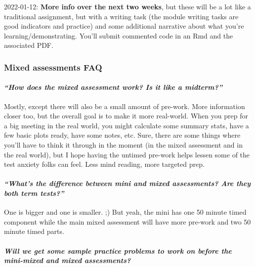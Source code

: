 \documentclass[
  openany]{book}
\begin{document}
2022-01-12: \textbf{More info over the next two weeks}, but these will be a lot like a traditional assignment, but with a writing task (the module writing tasks are good indicators and practice) and some additional narrative about what you're learning/demonstrating. You'll submit commented code in an Rmd and the associated PDF.

\hypertarget{mixed-assessments-faq}{%
\subsubsection{Mixed assessments FAQ}\label{mixed-assessments-faq}}

\hypertarget{how-does-the-mixed-assessment-work-is-it-like-a-midterm}{%
\paragraph{\texorpdfstring{\emph{``How does the mixed assessment work? Is it like a midterm?''}}{``How does the mixed assessment work? Is it like a midterm?''}}\label{how-does-the-mixed-assessment-work-is-it-like-a-midterm}}

Mostly, except there will also be a small amount of pre-work. More information closer too, but the overall goal is to make it more real-world. When you prep for a big meeting in the real world, you might calculate some summary stats, have a few basic plots ready, have some notes, etc. Sure, there are some things where you'll have to think it through in the moment (in the mixed assessment and in the real world), but I hope having the untimed pre-work helps lessen some of the test anxiety folks can feel. Less mind reading, more targeted prep.

\hypertarget{whats-the-difference-between-mini-and-mixed-assessments-are-they-both-term-tests}{%
\paragraph{\texorpdfstring{\emph{``What's the difference between mini and mixed assessments? Are they both term tests?''}}{``What's the difference between mini and mixed assessments? Are they both term tests?''}}\label{whats-the-difference-between-mini-and-mixed-assessments-are-they-both-term-tests}}

One is bigger and one is smaller. ;) But yeah, the mini has one 50 minute timed component while the main mixed assessment will have more pre-work and two 50 minute timed parts.

\hypertarget{will-we-get-some-sample-practice-problems-to-work-on-before-the-mini-mixed-and-mixed-assessments}{%
\paragraph{\texorpdfstring{\emph{Will we get some sample practice problems to work on before the mini-mixed and mixed assessments?}}{Will we get some sample practice problems to work on before the mini-mixed and mixed assessments?}}\label{will-we-get-some-sample-practice-problems-to-work-on-before-the-mini-mixed-and-mixed-assessments}}
\end{document}
